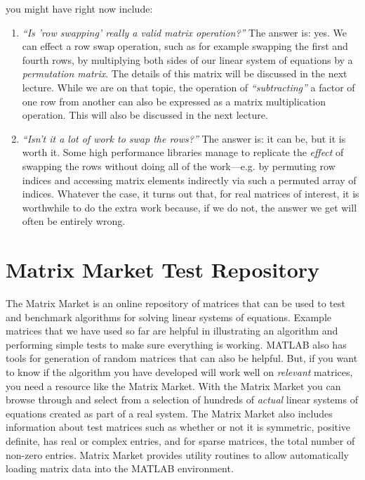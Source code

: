
 you might have right now include:
\begin{enumerate}
\item \emph{``Is 'row swapping' really a valid matrix operation?''} The answer is: yes.  We can effect a row swap operation, such as for example swapping the first and fourth rows, by multiplying both sides of our linear system of equations by a \emph{permutation matrix}.  The details of this matrix will be discussed in the next lecture.  While we are on that topic, the operation of \emph{``subtracting''} a factor of one row from another can also be expressed as a matrix multiplication operation.  This will also be discussed in the next lecture.

\item \emph{``Isn't it a lot of work to swap the rows?''} The answer is: it can be, but it is worth it.  Some high performance libraries manage to replicate the \emph{effect} of swapping the rows without doing all of the work---e.g. by permuting row indices and accessing matrix elements indirectly via such a permuted array of indices.  Whatever the case, it turns out that, for real matrices of interest, it is worthwhile to do the extra work because, if we do not, the answer we get will often be entirely wrong.

\end{enumerate}

\section{Matrix Market Test Repository}

The Matrix Market is an online repository of matrices that can be used to test and benchmark algorithms for solving linear systems of equations.\cite{MatrixMarket}  Example matrices that we have used so far are helpful in illustrating an algorithm and performing simple tests to make sure everything is working.  MATLAB also has tools for generation of random matrices that can also be helpful.  But, if you want to know if the algorithm you have developed will work well on \emph{relevant} matrices, you need a resource like the Matrix Market.  With the Matrix Market you can browse through and select from a selection of hundreds of \emph{actual} linear systems of equations created as part of a real system.  The Matrix Market also includes information about test matrices such as whether or not it is symmetric, positive definite, has real or complex entries, and for sparse matrices, the total number of non-zero entries.  Matrix Market provides utility routines to allow automatically loading matrix data into the MATLAB environment.

